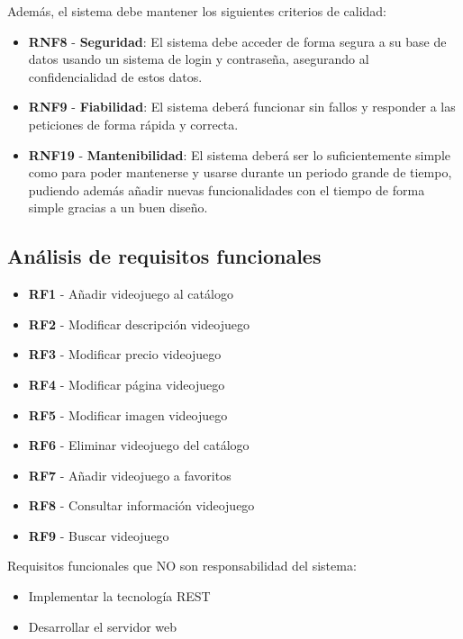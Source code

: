 \documentclass[11pt, spanish]{article}
\begin{document}
Además, el sistema debe mantener los siguientes criterios de calidad:

\begin{itemize}
\item \textbf{RNF8} - \textbf{Seguridad}: El sistema debe acceder de forma segura a su base de datos usando un sistema de login y contraseña, asegurando al confidencialidad de estos datos.

\item \textbf{RNF9} - \textbf{Fiabilidad}: El sistema deberá funcionar sin fallos y responder a las peticiones de forma rápida y correcta.

\item \textbf{RNF19} - \textbf{Mantenibilidad}: El sistema deberá ser lo suficientemente simple como para poder mantenerse y usarse durante un periodo grande de tiempo, pudiendo además añadir nuevas funcionalidades con el tiempo de forma simple gracias a un buen diseño.
\end{itemize}

\subsection{Análisis de requisitos funcionales}

\begin{itemize}
\item \textbf{RF1} - Añadir videojuego al catálogo
\item \textbf{RF2} - Modificar descripción videojuego
\item \textbf{RF3} - Modificar precio videojuego
\item \textbf{RF4} - Modificar página videojuego
\item \textbf{RF5} - Modificar imagen videojuego
\item \textbf{RF6} - Eliminar videojuego del catálogo
\item \textbf{RF7} - Añadir videojuego a favoritos
\item \textbf{RF8} - Consultar información videojuego
\item \textbf{RF9} - Buscar videojuego
\end{itemize}

Requisitos funcionales que NO son responsabilidad del sistema:

\begin{itemize}
\item Implementar la tecnología REST
\item Desarrollar el servidor web
\end{itemize}
\end{document}
